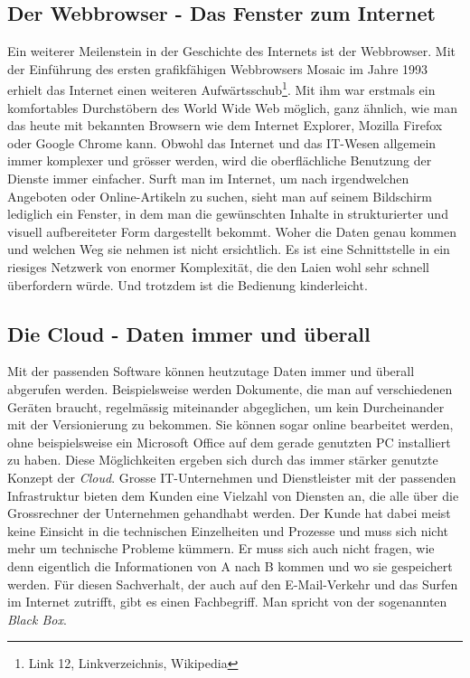 \subsection{Der Webbrowser - Das Fenster zum Internet} 
Ein weiterer Meilenstein in der Geschichte des Internets ist der Webbrowser. Mit der Einführung des ersten grafikfähigen Webbrowsers Mosaic im Jahre 1993 erhielt das Internet einen weiteren Aufwärtsschub\footnote{Link 12, Linkverzeichnis, Wikipedia}.
Mit ihm war erstmals ein komfortables Durchstöbern des World Wide Web möglich, ganz ähnlich, wie man das heute mit bekannten Browsern wie dem Internet Explorer, Mozilla Firefox oder Google Chrome kann. Obwohl das Internet und das IT-Wesen allgemein immer komplexer und grösser werden, wird die oberflächliche Benutzung der Dienste immer einfacher. Surft man im Internet, um nach irgendwelchen Angeboten oder Online-Artikeln zu suchen, sieht man auf seinem Bildschirm lediglich ein Fenster, in dem man die gewünschten Inhalte in strukturierter und visuell aufbereiteter Form dargestellt bekommt. Woher die Daten genau kommen und welchen Weg sie nehmen ist nicht ersichtlich. Es ist eine Schnittstelle in ein riesiges Netzwerk von enormer Komplexität, die den Laien wohl sehr schnell überfordern würde. Und trotzdem ist die Bedienung kinderleicht.

\subsection{Die Cloud - Daten immer und überall}
Mit der passenden Software können heutzutage Daten immer und überall abgerufen werden. Beispielsweise werden Dokumente, die man auf verschiedenen Geräten braucht, regelmässig miteinander abgeglichen, um kein Durcheinander mit der Versionierung zu bekommen. Sie können sogar online bearbeitet werden, ohne beispielsweise ein Microsoft Office auf dem gerade genutzten PC installiert zu haben. Diese Möglichkeiten ergeben sich durch das immer stärker genutzte Konzept der \textit{Cloud}. Grosse IT-Unternehmen und Dienstleister mit der passenden Infrastruktur bieten dem Kunden eine Vielzahl von Diensten an, die alle über die Grossrechner der Unternehmen gehandhabt werden. Der Kunde hat dabei meist keine Einsicht in die technischen Einzelheiten und Prozesse und muss sich nicht mehr um technische Probleme kümmern. Er muss sich auch nicht fragen, wie denn eigentlich die Informationen von A nach B kommen und wo sie gespeichert werden. Für diesen Sachverhalt, der auch auf den E-Mail-Verkehr und das Surfen im Internet zutrifft, gibt es einen Fachbegriff. Man spricht von der sogenannten \textit{Black Box}.

